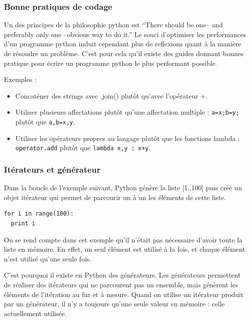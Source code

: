 \documentclass[a4paper]{article}
\begin{document}
\label{OptCode}

\subsubsection{Bonne pratiques de codage}

Un des principes de la philosophie python est ``There should be one--
and preferably only one --obvious way to do it.''\cite{ZenPython} Le
souci d'optimiser les performances d'un programme python induit
cependant plus de reflexions quant à la manière de résoudre un
problème. C'est pour cela qu'il existe des guides donnant bonnes
pratique pour écrire un programme python le plus performant
possible\cite{PythonSpeed}.

Exemples :
\begin{itemize}
\item Concaténer des strings avec .join() plutôt qu'avec l'opérateur +.
\item Utiliser plusieurs affectations plutôt qu'une affectation
  multiple : \lstinline|a=x;b=y;| plutôt que \lstinline|a,b=x,y|.
\item Utiliser les opérateurs propres au langage plutôt que les
  fonctions lambda : \lstinline|operator.add| plutôt que
  \lstinline|lambda x,y : x+y|.
\end{itemize}

\subsubsection{Itérateurs et générateur}

Dans la boucle de l'exemple suivant, Python génère la liste [1..100]
puis créé un objet itérateur qui permet de parcourir un à un les
éléments de cette liste.

\begin{lstlisting}
for i in range(100):
  print i
\end{lstlisting}

On se rend compte dans cet exemple qu'il n'était pas nécessaire
d'avoir toute la liste en mémoire. En effet, un seul élément est
utilisé à la fois, et chaque élément n'est utilisé qu'une seule fois.

C'est pourquoi il existe en Python des générateurs. Les générateurs
permettent de réaliser des itérateurs qui ne parcourent pas un
ensemble, mais génèrent les éléments de l'itération au fur et à
mesure. Quand on utilise un itérateur produit par un générateur, il
n'y a toujours qu'une seule valeur en mémoire : celle actuellement
utilisée.
\end{document}
